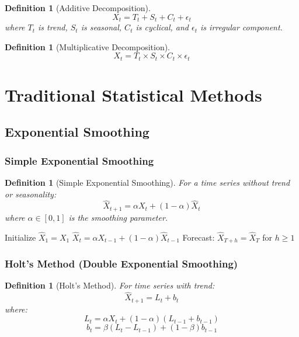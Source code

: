 \documentclass[11pt,a4paper]{article}
\newtheorem{definition}[theorem]{Definition}
\begin{document}
\begin{definition}[Additive Decomposition]
$$X_t = T_t + S_t + C_t + \epsilon_t$$
where $T_t$ is trend, $S_t$ is seasonal, $C_t$ is cyclical, and $\epsilon_t$ is irregular component.
\end{definition}

\begin{definition}[Multiplicative Decomposition]
$$X_t = T_t \times S_t \times C_t \times \epsilon_t$$
\end{definition}

\section{Traditional Statistical Methods}

\subsection{Exponential Smoothing}

\subsubsection{Simple Exponential Smoothing}

\begin{definition}[Simple Exponential Smoothing]
For a time series without trend or seasonality:
$$\hat{X}_{t+1} = \alpha X_t + (1-\alpha)\hat{X}_t$$
where $\alpha \in [0,1]$ is the smoothing parameter.
\end{definition}

\begin{algorithm}
\caption{Simple Exponential Smoothing}
\begin{algorithmic}[1]
\STATE Initialize $\hat{X}_1 = X_1$
    \STATE $\hat{X}_t = \alpha X_{t-1} + (1-\alpha)\hat{X}_{t-1}$
\ENDFOR
\STATE Forecast: $\hat{X}_{T+h} = \hat{X}_T$ for $h \geq 1$
\end{algorithmic}
\end{algorithm}

\subsubsection{Holt's Method (Double Exponential Smoothing)}

\begin{definition}[Holt's Method]
For time series with trend:
$$\hat{X}_{t+1} = L_t + b_t$$
where:
$$L_t = \alpha X_t + (1-\alpha)(L_{t-1} + b_{t-1})$$
$$b_t = \beta(L_t - L_{t-1}) + (1-\beta)b_{t-1}$$
\end{definition}
\end{document}
